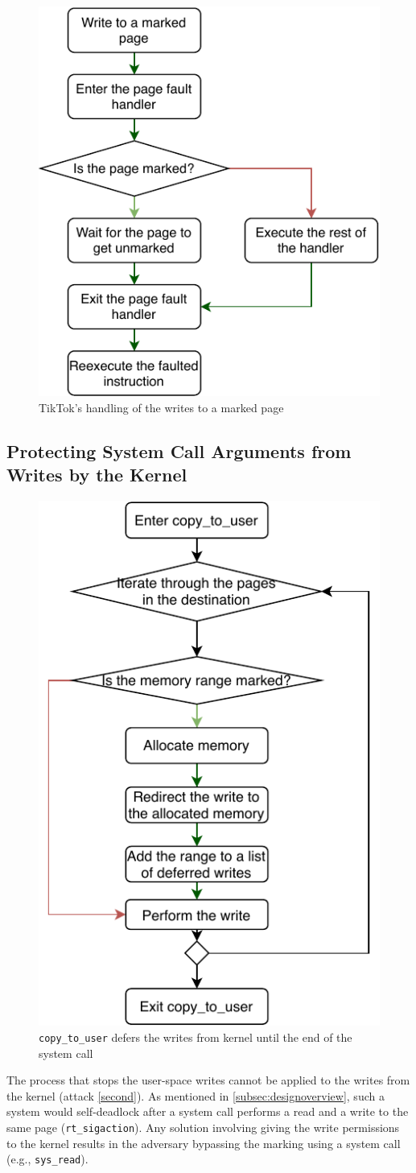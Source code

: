 \begin{figure}[]
  \centering
  \includegraphics[width = .75 \linewidth]{img/pagefault.pdf}
  \caption{TikTok's handling of the writes to a marked page}
  \label{fig:pagefault}
\end{figure}

\subsection{Protecting System Call Arguments from Writes by the Kernel}
\label{subsec:kernelland}
\begin{figure}[]
  \centering
  \includegraphics[width = .30 \textwidth]{img/copy_to_user.pdf}
  \caption{\texttt{copy\_to\_user} defers the writes from kernel until the end
  of the system call}
  \label{fig:copytouser}
\end{figure}

The process that stops the user-space writes cannot be applied to the writes from
the kernel (attack \ref{second}). As mentioned in \cref{subsec:designoverview},
such a system would self-deadlock after a system call performs a read and a
write to the same page (\texttt{rt\_sigaction}). Any solution involving giving
the write permissions to the kernel results in the adversary bypassing the
marking using a system call (e.g., \texttt{sys\_read}).

